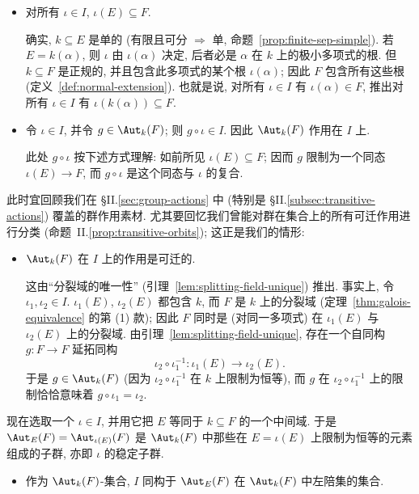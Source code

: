 \begin{itemize}
\item 对所有 $\iota\in I$, $\iota(E)\subseteq F$.

确实, $k\subseteq E$ 是单的 (有限且可分 $\Longrightarrow$ 单, 命题~\ref{prop:finite-sep-simple}). 若 $E=k(\alpha)$, 则 $\iota$ 由 $\iota(\alpha)$ 决定, 后者必是 $\alpha$ 在 $k$ 上的极小多项式的根. 但 $k\subseteq F$ 是正规的, 并且包含此多项式的某个根 $\iota(\alpha)$; 因此 $F$ 包含所有这些根 (定义~\ref{def:normal-extension}). 也就是说, 对所有 $\iota\in I$ 有 $\iota(\alpha)\in F$, 推出对所有 $\iota\in I$ 有 $\iota(k(\alpha))\subseteq F$.
\item 令 $\iota\in I$, 并令 $g\in\Aut_k(F)$; 则 $g\circ\iota\in I$. 因此 $\Aut_k(F)$ 作用在 $I$ 上.

此处 $g\circ\iota$ 按下述方式理解: 如前所见 $\iota(E)\subseteq F$; 因而 $g$ 限制为一个同态 $\iota(E)\to F$, 而 $g\circ\iota$ 是这个同态与 $\iota$ 的复合.
\end{itemize}

此时宜回顾我们在 §II.\ref{sec:group-actions} 中 (特别是 §II.\ref{subsec:transitive-actions}) 覆盖的群作用素材. 尤其要回忆我们曾能对群在集合上的所有可迁作用进行分类 (命题~II.\ref{prop:transitive-orbits}); 这正是我们的情形:

\begin{itemize}
\item $\Aut_k(F)$ 在 $I$ 上的作用是可迁的.

这由``分裂域的唯一性'' (引理~\ref{lem:splitting-field-unique}) 推出. 事实上, 令 $\iota_1,\iota_2\in I$. $\iota_1(E)$, $\iota_2(E)$ 都包含 $k$, 而 $F$ 是 $k$ 上的分裂域 (定理~\ref{thm:galois-equivalence} 的第 (1) 款); 因此 $F$ 同时是 (对同一多项式) 在 $\iota_1(E)$ 与 $\iota_2(E)$ 上的分裂域. 由引理~\ref{lem:splitting-field-unique}, 存在一个自同构 $g:F\to F$ 延拓同构
\[
\iota_2\circ\iota_1^{-1}:\iota_1(E)\to\iota_2(E).
\]
于是 $g\in\Aut_k(F)$ (因为 $\iota_2\circ\iota_1^{-1}$ 在 $k$ 上限制为恒等), 而 $g$ 在 $\iota_2\circ\iota_1^{-1}$ 上的限制恰恰意味着 $g\circ\iota_1=\iota_2$.
\end{itemize}

现在选取一个 $\iota\in I$, 并用它把 $E$ 等同于 $k\subseteq F$ 的一个中间域. 于是 $\Aut_E(F)=\Aut_{\iota(E)}(F)$ 是 $\Aut_k(F)$ 中那些在 $E=\iota(E)$ 上限制为恒等的元素组成的子群, 亦即 $\iota$ 的稳定子群.

\begin{itemize}
\item 作为 $\Aut_k(F)$-集合, $I$ 同构于 $\Aut_E(F)$ 在 $\Aut_k(F)$ 中左陪集的集合.
\end{itemize}

